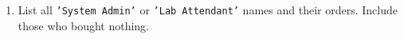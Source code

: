 \documentclass[12pt,a4paper]{article}
\begin{document}
\begin{enumerate}



    \item List all \texttt{'System Admin'} or \texttt{'Lab Attendant'} names and their orders. Include those who bought nothing.





\end{enumerate}
\end{document}
